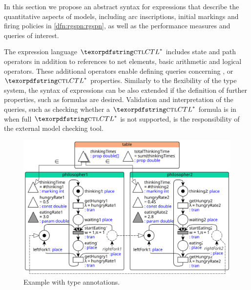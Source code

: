 In this section we propose an abstract syntax for expressions that describe the quantitative aspects of  models, including arc inscriptions, initial markings and firing policies in \vref{dfn:rgspn:rgspn}, as well as the performance measures and queries of interest.

The expression language \(\textabbr{CTL}^*\) includes state and path operators in addition to references to net elements, basic arithmetic and logical operators. These additional operators enable defining queries concerning ,  or \(\textabbr{CTL}^*\) properties. Similarly to the flexibility of the type system, the syntax of expressions can be also extended if the definition of further properties, such as  formulas are desired. Validation and interpretation of the queries, such as checking whether a \(\textabbr{CTL}^*\) formula is in  when full \(\textabbr{CTL}^*\) is not supported, is the responsibility of the external model checking tool.

\begin{figure}
  \centering
  \includegraphics[scale=0.9]{figures/rgspn_example_typed}
  \caption{Example  with type annotations.}
  \label{fig:rgspn:example-typed}
\end{figure}

